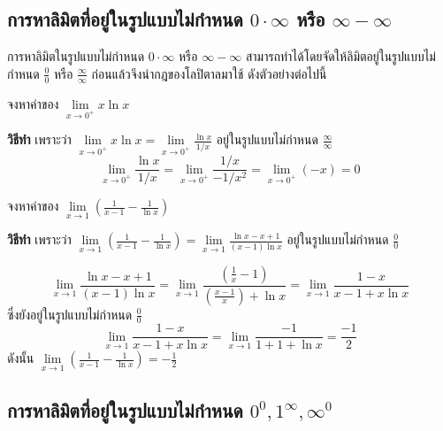 \documentclass[
]{book}
\begin{document}
\subsection{\texorpdfstring{การหาลิมิตที่อยู่ในรูปแบบไม่กำหนด \(0\cdot \infty\)
หรือ \(\infty
-\infty\)}{การหาลิมิตที่อยู่ในรูปแบบไม่กำหนด 0\textbackslash cdot \textbackslash infty หรือ \textbackslash infty
-\textbackslash infty}}\label{uxe01uxe32uxe23uxe2buxe32uxe25uxe21uxe15uxe17uxe2duxe22uxe43uxe19uxe23uxe1buxe41uxe1auxe1auxe44uxe21uxe01uxe33uxe2buxe19uxe14-0cdot-infty-uxe2buxe23uxe2d-infty--infty}

การหาลิมิตในรูปแบบไม่กำหนด \(0\cdot \infty\) หรือ \(\infty -\infty\)
สามารถทำได้โดยจัดให้ลิมิตอยู่ในรูปแบบไม่กำหนด \(\displaystyle \frac{0}{0}\) หรือ
\(\displaystyle \frac{\infty }{\infty }\) ก่อนแล้วจึงนำกฎของโลปิตาลมาใช้
ดังตัวอย่างต่อไปนี้

จงหาค่าของ \(\mathop {\lim }\limits_{x\to 0^+} x\ln x\)

\textbf{วิธีทำ} เพราะว่า
\(\displaystyle \mathop {\lim }\limits_{x\to 0^+} x\ln x=\mathop
{\lim
}\limits_{x\to 0^+} \frac{\ln x}{1/x}\) อยู่ในรูปแบบไม่กำหนด \(\displaystyle
\frac{\infty
}{\infty }\)
\[\displaystyle \mathop {\lim }\limits_{x\to 0^+} \frac{\ln x}{1/x}=\mathop 
{\lim 
}\limits_{x\to 0^+} \frac{1/x}{-1/x^2}=\mathop {\lim }\limits_{x\to 0^+} 
(-x)=0\]

จงหาค่าของ \(\displaystyle \mathop {\lim }\limits_{x\to 1}
(\frac{1}{x-1}-\frac{1}{\ln x})\)

\textbf{วิธีทำ} เพราะว่า \(\displaystyle \mathop {\lim }\limits_{x\to 1}
(\frac{1}{x-1}-\frac{1}{\ln
x})=\mathop {\lim }\limits_{x\to 1} \frac{\ln x-x+1}{(x-1)\ln x}\)
อยู่ในรูปแบบไม่กำหนด \(\displaystyle \frac{0}{0}\)

\[\displaystyle \mathop {\lim }\limits_{x\to 1} \frac{\ln x-x+1}{(x-1)\ln 
x}=\mathop {\lim 
}\limits_{x\to 1} \frac{(\frac{1}{x}-1)}{(\frac{x-1}{x})+\ln x}=\mathop 
{\lim }\limits_{x\to 1} \frac{1-x}{x-1+x\ln x}\] ซึ่งยังอยู่ในรูปแบบไม่กำหนด
\(\displaystyle \frac{0}{0}\)
\[\displaystyle \mathop {\lim }\limits_{x\to 1} \frac{1-x}{x-1+x\ln 
x}=\mathop {\lim 
}\limits_{x\to 1} \frac{-1}{1+1+\ln x}=\frac{-1}{2}\] ดังนั้น
\(\displaystyle \mathop {\lim }\limits_{x\to 1}
(\frac{1}{x-1}-\frac{1}{\ln
x})=-\frac{1}{2}\)

\subsection{\texorpdfstring{การหาลิมิตที่อยู่ในรูปแบบไม่กำหนด
\(0^{0}, 1^{\infty}, \infty^0\)}{การหาลิมิตที่อยู่ในรูปแบบไม่กำหนด 0\^{}\{0\}, 1\^{}\{\textbackslash infty\}, \textbackslash infty\^{}0}}\label{uxe01uxe32uxe23uxe2buxe32uxe25uxe21uxe15uxe17uxe2duxe22uxe43uxe19uxe23uxe1buxe41uxe1auxe1auxe44uxe21uxe01uxe33uxe2buxe19uxe14-00-1infty-infty0}
\end{document}

